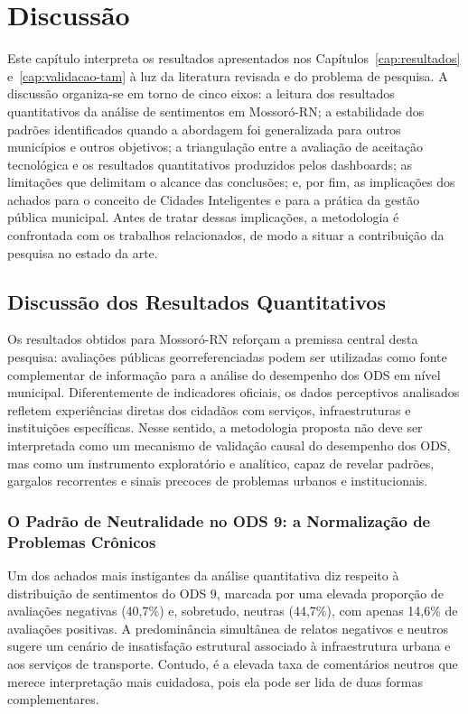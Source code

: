 \chapter{Discussão}
\label{cap:discussao}

Este capítulo interpreta os resultados apresentados nos Capítulos~\ref{cap:resultados} e~\ref{cap:validacao-tam} à luz da literatura revisada e do problema de pesquisa. A discussão organiza-se em torno de cinco eixos: a leitura dos resultados quantitativos da análise de sentimentos em Mossoró-RN; a estabilidade dos padrões identificados quando a abordagem foi generalizada para outros municípios e outros objetivos; a triangulação entre a avaliação de aceitação tecnológica e os resultados quantitativos produzidos pelos dashboards; as limitações que delimitam o alcance das conclusões; e, por fim, as implicações dos achados para o conceito de Cidades Inteligentes e para a prática da gestão pública municipal. Antes de tratar dessas implicações, a metodologia é confrontada com os trabalhos relacionados, de modo a situar a contribuição da pesquisa no estado da arte.

\section{Discussão dos Resultados Quantitativos}
\label{sec:disc-quantitativos}

Os resultados obtidos para Mossoró-RN reforçam a premissa central desta pesquisa: avaliações públicas georreferenciadas podem ser utilizadas como fonte complementar de informação para a análise do desempenho dos ODS em nível municipal. Diferentemente de indicadores oficiais, os dados perceptivos analisados refletem experiências diretas dos cidadãos com serviços, infraestruturas e instituições específicas. Nesse sentido, a metodologia proposta não deve ser interpretada como um mecanismo de validação causal do desempenho dos ODS, mas como um instrumento exploratório e analítico, capaz de revelar padrões, gargalos recorrentes e sinais precoces de problemas urbanos e institucionais.

\subsection{O Padrão de Neutralidade no ODS 9: a Normalização de Problemas Crônicos}
\label{subsec:disc-neutros-ods9}

Um dos achados mais instigantes da análise quantitativa diz respeito à distribuição de sentimentos do ODS 9, marcada por uma elevada proporção de avaliações negativas (40,7\%) e, sobretudo, neutras (44,7\%), com apenas 14,6\% de avaliações positivas. A predominância simultânea de relatos negativos e neutros sugere um cenário de insatisfação estrutural associado à infraestrutura urbana e aos serviços de transporte. Contudo, é a elevada taxa de comentários neutros que merece interpretação mais cuidadosa, pois ela pode ser lida de duas formas complementares.

